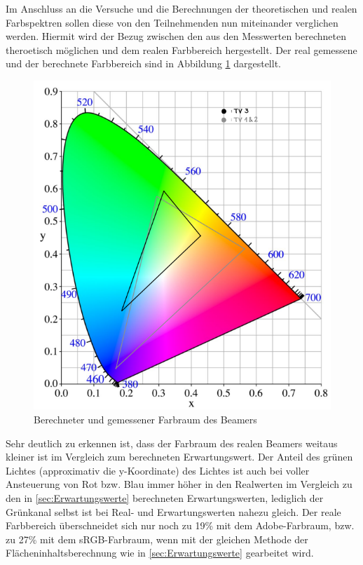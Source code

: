 \label{A_FCOORDS}

Im Anschluss an die Versuche und die Berechnungen der theoretischen und realen Farbspektren sollen diese von den Teilnehmenden nun miteinander verglichen werden. Hiermit wird der Bezug zwischen den aus den Messwerten berechneten theroetisch möglichen und dem realen Farbbereich hergestellt. Der real gemessene und der berechnete Farbbereich sind in Abbildung \ref{A_Farbdreieck} dargestellt.

\begin{figure}[h]
	\centering
	\includegraphics[scale=0.6]{Images/A_Farbdreieck.png}
	\caption{Berechneter und gemessener Farbraum des Beamers}
	\label{A_Farbdreieck}
\end{figure}

Sehr deutlich zu erkennen ist, dass der Farbraum des realen Beamers weitaus kleiner ist im Vergleich zum berechneten Erwartungswert. Der Anteil des grünen Lichtes (approximativ die y-Koordinate) des Lichtes ist auch bei voller Ansteuerung von Rot bzw. Blau immer höher in den Realwerten im Vergleich zu den in \ref{sec:Erwartungswerte} berechneten Erwartungswerten, lediglich der Grünkanal selbst ist bei Real- und Erwartungswerten nahezu gleich. Der reale Farbbereich überschneidet sich nur noch zu 19\% mit dem Adobe-Farbraum, bzw. zu 27\% mit dem sRGB-Farbraum, wenn mit der gleichen Methode der Flächeninhaltsberechnung wie in \ref{sec:Erwartungswerte} gearbeitet wird.

